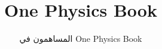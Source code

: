 \documentclass[11pt,a4paper,twoside,openany]{book}
\title{One Physics Book}
\author{المساهمون في One Physics Book}
\date{\bookdate}
\begin{document}
\frontmatter




\tableofcontents

\mainmatter



\appendix
\part{\omsolutionspart}


\backmatter
\printindex
\end{document}
